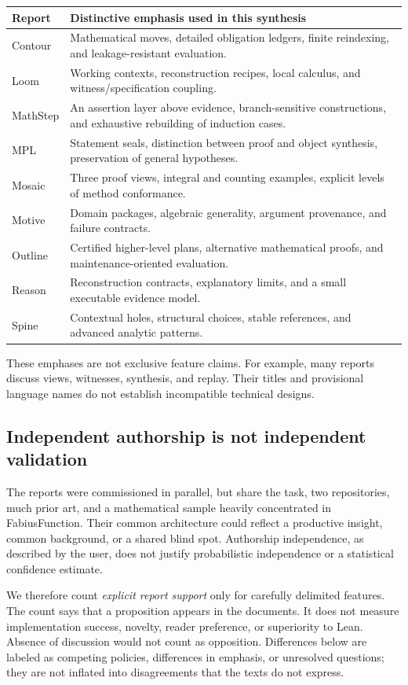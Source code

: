 \documentclass[11pt,letterpaper]{article}
\begin{document}
\begin{tabularx}{\textwidth}{@{}lY@{}}
\toprule
Report & Distinctive emphasis used in this synthesis \\
\midrule
Contour & Mathematical moves, detailed obligation ledgers, finite reindexing, and leakage-resistant evaluation.\\
Loom & Working contexts, reconstruction recipes, local calculus, and witness/specification coupling.\\
MathStep & An assertion layer above evidence, branch-sensitive constructions, and exhaustive rebuilding of induction cases.\\
MPL & Statement seals, distinction between proof and object synthesis, preservation of general hypotheses.\\
Mosaic & Three proof views, integral and counting examples, explicit levels of method conformance.\\
Motive & Domain packages, algebraic generality, argument provenance, and failure contracts.\\
Outline & Certified higher-level plans, alternative mathematical proofs, and maintenance-oriented evaluation.\\
Reason & Reconstruction contracts, explanatory limits, and a small executable evidence model.\\
Spine & Contextual holes, structural choices, stable references, and advanced analytic patterns.\\
\bottomrule
\end{tabularx}

These emphases are not exclusive feature claims. For example, many reports discuss
views, witnesses, synthesis, and replay. Their titles and provisional language names
do not establish incompatible technical designs.

\subsection{Independent authorship is not independent validation}
The reports were commissioned in parallel, but share the task, two repositories,
much prior art, and a mathematical sample heavily concentrated in FabiusFunction.
Their common architecture could reflect a productive insight, common background,
or a shared blind spot. Authorship independence, as described by the user, does
not justify probabilistic independence or a statistical confidence estimate.

We therefore count \emph{explicit report support} only for carefully delimited
features. The count says that a proposition appears in the documents. It does not
measure implementation success, novelty, reader preference, or superiority to Lean.
Absence of discussion would not count as opposition. Differences below are labeled
as competing policies, differences in emphasis, or unresolved questions; they are
not inflated into disagreements that the texts do not express.
\end{document}
